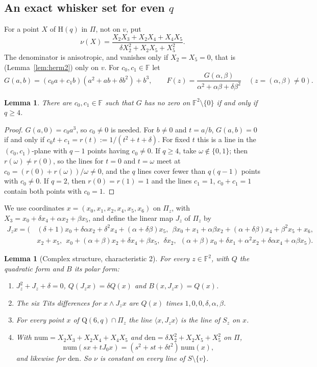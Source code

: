 \documentclass[11pt]{amsart}
\newtheorem{lemma}[theorem]{Lemma}
\theoremstyle{definition}
\theoremstyle{remark}
\newcommand{\F}{\mathbb{F}}
\newcommand{\Hq}{\mathrm{H}}
\newcommand{\Qf}{\mathrm{Q}}
\begin{document}
\subsection{An exact whisker set for even \texorpdfstring{$q$}{q}}
For a point $X$ of $\Hq(q)$ in $\Pi$, not on $v$, put
\[
\nu(X)=\frac{X_2X_3+X_2X_4+X_4X_5}{\delta X_2^2+X_2X_5+X_5^2}.
\]
The denominator is anisotropic, and vanishes only if $X_2=X_5=0$, that is (Lemma~\ref{lem:herm2}) only on $v$. For $c_0,c_1\in\F$ let
\[
G(a,b)=(c_0a+c_1b)(a^2+ab+\delta b^2)+b^3,\qquad F(z)=\frac{G(\alpha,\beta)}{\alpha^2+\alpha\beta+\delta\beta^2}\quad(z=(\alpha,\beta)\ne0).
\]

\begin{lemma}\label{lem:G2}
There are $c_0,c_1\in\F$ such that $G$ has no zero on $\F^2\setminus\{0\}$ if and only if $q\ge4$.
\end{lemma}

\begin{proof}
$G(a,0)=c_0a^3$, so $c_0\ne0$ is needed. For $b\ne0$ and $t=a/b$, $G(a,b)=0$ if and only if $c_0t+c_1=r(t):=1/(t^2+t+\delta)$. For fixed $t$ this is a line in the $(c_0,c_1)$-plane with $q-1$ points having $c_0\ne0$. If $q\ge4$, take $\omega\notin\{0,1\}$; then $r(\omega)\ne r(0)$, so the lines for $t=0$ and $t=\omega$ meet at $c_0=(r(0)+r(\omega))/\omega\ne0$, and the $q$ lines cover fewer than $q(q-1)$ points with $c_0\ne0$. If $q=2$, then $r(0)=r(1)=1$ and the lines $c_1=1$, $c_0+c_1=1$ contain both points with $c_0=1$.
\end{proof}

We use coordinates $x=(x_0,x_1,x_2,x_4,x_5,x_6)$ on $\Pi_z$, with $X_3=x_0+\delta x_4+\alpha x_2+\beta x_5$, and define the linear map $J_z$ of $\Pi_z$ by
\[
\begin{aligned}
J_zx=\bigl(\,&(\delta+1)x_0+\delta\alpha x_2+\delta^2x_4+(\alpha+\delta\beta)x_5,\ \ \beta x_0+x_1+\alpha\beta x_2+(\alpha+\delta\beta)x_4+\beta^2x_5+x_6,\\
&x_2+x_5,\ \ x_0+(\alpha+\beta)x_2+\delta x_4+\beta x_5,\ \ \delta x_2,\ \ (\alpha+\beta)x_0+\delta x_1+\alpha^2x_2+\delta\alpha x_4+\alpha\beta x_5\,\bigr).
\end{aligned}
\]

\begin{lemma}[Complex structure, characteristic 2]\label{lem:J2}
For every $z\in\F^2$, with $Q$ the quadratic form and $B$ its polar form:
\begin{enumerate}[label=\textup{(\alph*)}]
\item $J_z^2+J_z+\delta=0$, $Q(J_zx)=\delta Q(x)$ and $B(x,J_zx)=Q(x)$.
\item The six Tits differences for $x\wedge J_zx$ are $Q(x)$ times $1,0,0,\delta,\alpha,\beta$.
\item For every point $x$ of $\Qf(6,q)\cap\Pi_z$ the line $\langle x,J_zx\rangle$ is the line of $S_z$ on $x$.
\item With $\mathrm{num}=X_2X_3+X_2X_4+X_4X_5$ and $\mathrm{den}=\delta X_2^2+X_2X_5+X_5^2$ on $\Pi$,
\[
\mathrm{num}(sx+tJ_0x)=(s^2+st+\delta t^2)\,\mathrm{num}(x),
\]
and likewise for $\mathrm{den}$. So $\nu$ is constant on every line of $S\setminus\{v\}$.
\end{enumerate}
\end{lemma}
\end{document}
